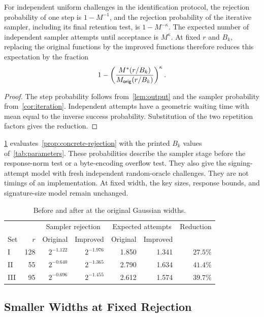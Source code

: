\begin{proposition}
\label{prop:concrete-rejection}
For independent uniform challenges in the identification protocol, the rejection probability of one step is $1-M^{-1}$, and the rejection probability of the iterative sampler, including its final retention test, is $1-M^{-\kappa}$. The expected number of independent sampler attempts until acceptance is $M^\kappa$. At fixed $r$ and $B_k$, replacing the original functions by the improved functions therefore reduces this expectation by the fraction
\[
 1-\left(\frac{M^*(r/B_k)}{M_{\mathsf{orig}}(r/B_k)}\right)^\kappa.
\]
\end{proposition}
\begin{proof}
The step probability follows from~\cref{lem:output} and the sampler probability from~\cref{cor:iteration}. Independent attempts have a geometric waiting time with mean equal to the inverse success probability. Substitution of the two repetition factors gives the reduction.
\end{proof}

\cref{tab:fixed-width} evaluates~\cref{prop:concrete-rejection} with the printed $B_k$ values of~\cref{tab:parameters}. These probabilities describe the sampler stage before the response-norm test or a byte-encoding overflow test. They also give the signing-attempt model with fresh independent random-oracle challenges. They are not timings of an implementation. At fixed width, the key sizes, response bounds, and signature-size model remain unchanged.

\begin{table}[t]
\centering
\begin{tabular}{lrrrrrr}
\toprule
& & \multicolumn{2}{c}{Sampler rejection} & \multicolumn{2}{c}{Expected attempts} & Reduction\\
Set & $r$ & Original & Improved & Original & Improved & \\
\midrule
I & 128 & $2^{-1.122}$ & $2^{-1.976}$ & 1.850 & 1.341 & $27.5\%$\\
II & 55 & $2^{-0.640}$ & $2^{-1.365}$ & 2.790 & 1.634 & $41.4\%$\\
III & 95 & $2^{-0.696}$ & $2^{-1.455}$ & 2.612 & 1.574 & $39.7\%$\\
\bottomrule
\end{tabular}
\caption{Before and after at the original Gaussian widths.}
\label{tab:fixed-width}
\end{table}

\subsection{Smaller Widths at Fixed Rejection}

